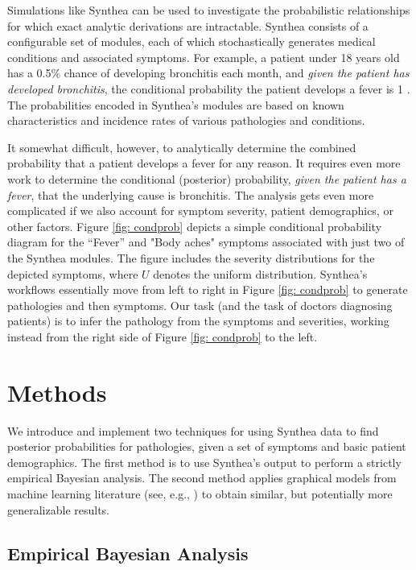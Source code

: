 \documentclass[11pt]{article}
\begin{document}


Simulations like Synthea can be used to investigate the probabilistic relationships for which exact analytic derivations are intractable.  Synthea \citep{walonoski2018synthea} consists of a configurable set of modules, each of which stochastically generates medical conditions and associated symptoms. For example, a patient under 18 years old has a 0.5\% chance of developing bronchitis each month, and \emph{given the patient has developed bronchitis}, the conditional probability the patient develops a fever is 1 \citep{bronchitisModule}.  The probabilities encoded in Synthea's modules are based on known characteristics and incidence rates of various pathologies and conditions.

It somewhat difficult, however, to analytically determine the combined probability that a patient develops a fever for any reason.  It requires even more work to determine the conditional (posterior) probability, \emph{given the patient has a fever}, that the underlying cause is bronchitis.  
The analysis gets even more complicated if we also account for symptom severity, patient demographics, or other factors.  
Figure \ref{fig: condprob} depicts a simple conditional probability diagram for the ``Fever'' and "Body aches" symptoms associated with just two of the Synthea modules.  The figure includes the severity distributions for the depicted symptoms, where $U$ denotes the uniform distribution.  Synthea's workflows essentially move from left to right in Figure \ref{fig: condprob} to generate pathologies and then symptoms.  Our task (and the task of doctors diagnosing patients) is to infer the pathology from the symptoms and severities, working instead from the right side of Figure \ref{fig: condprob} to the left.


\section{Methods}

We introduce and implement two techniques for using Synthea data to find posterior probabilities for pathologies, given a set of symptoms and basic patient demographics.  The first method is to use Synthea's output to perform a strictly empirical Bayesian analysis.  The second method applies graphical models from machine learning literature (see, e.g., \cite[pp 359--383]{bishop2013pattern}) to obtain similar, but potentially more generalizable results.

\subsection{Empirical Bayesian Analysis} \label{section: empirical-analysis}
\end{document}
